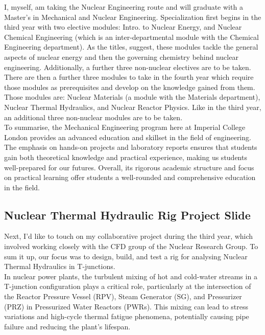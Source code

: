 \documentclass[8pt,a5paper]{article}
\begin{document}
I, myself, am taking the Nuclear Engineering route and will graduate with a Master’s in Mechanical and Nuclear Engineering. Specialization first begins in the third year with two elective modules: Intro. to Nuclear Energy, and Nuclear Chemical Engineering (which is an inter-departmental module with the Chemical Engineering department). As the titles, suggest, these modules tackle the general aspects of nuclear energy and then the governing chemistry behind nuclear engineering. Additionally, a further three non-nuclear electives are to be taken. There are then a further three modules to take in the fourth year which require those modules as prerequisites and develop on the knowledge gained from them. Those modules are: Nuclear Materials (a module with the Materials department), Nuclear Thermal Hydraulics, and Nuclear Reactor Physics. Like in the third year, an additional three non-nuclear modules are to be taken.\\

To summarise, the Mechanical Engineering program here at Imperial College London provides an advanced education and skillset in the field of engineering. The emphasis on hands-on projects and laboratory reports ensures that students gain both theoretical knowledge and practical experience, making us students well-prepared for our futures. Overall, its rigorous academic structure and focus on practical learning offer students a well-rounded and comprehensive education in the field.

\subsection*{Nuclear Thermal Hydraulic Rig Project Slide}

Next, I'd like to touch on my collaborative project during the third year, which involved working closely with the CFD group of the Nuclear Research Group. To sum it up, our focus was to design, build, and test a rig for analysing Nuclear Thermal Hydraulics in T-junctions.\\

In nuclear power plants, the turbulent mixing of hot and cold-water streams in a T-junction configuration plays a critical role, particularly at the intersection of the Reactor Pressure Vessel (RPV), Steam Generator (SG), and Pressurizer (PRZ) in Pressurized Water Reactors (PWRs). This mixing can lead to stress variations and high-cycle thermal fatigue phenomena, potentially causing pipe failure and reducing the plant's lifespan.\\
\end{document}
